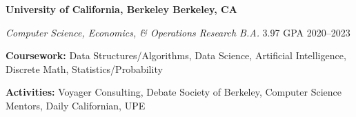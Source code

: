 \textbf{University of California, Berkeley \hfill Berkeley, CA} \par
\textit{Computer Science, Economics, \& Operations Research B.A.} 3.97 GPA \hfill 2020--2023\par
\textbf{Coursework:} Data Structures/Algorithms, Data Science, Artificial Intelligence, Discrete Math, Statistics/Probability\par
\textbf{Activities:} Voyager Consulting, Debate Society of Berkeley, Computer Science Mentors, Daily Californian, UPE